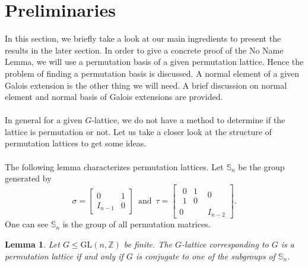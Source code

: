 \documentclass{article}
\theoremstyle{plain}
\newtheorem{lemma}[theorem]{Lemma}
\theoremstyle{definition}
\newcommand{\Z}{\ensuremath{\mathbb{Z}}}
\begin{document}
\section{Preliminaries}
In this section, we briefly take a look at our main ingredients to present the results in the later section. In order to give a concrete proof of the No Name Lemma, we will use a permutation basis of a given permutation lattice. Hence the problem of finding a permutation basis is discussed. A normal element of a given Galois extension is the other thing we will need. A brief discussion on normal element and normal basis of Galois extensions are provided.\\
\\
In general for a given $G$-lattice, we do not have a method to determine if the lattice is permutation or not. Let us take a closer look at the structure of permutation lattices to get some ideas.  \\
\\The following lemma characterizes permutation lattices. Let $\mathbb{S}_n$ be the group generated by $$
\sigma = \left[ \begin{array}{c|c}
0 & 1\\
\hline
I_{n-1} &0
\end{array} \right] \,\,\,
\text{and} \,\,\,
\tau = \left[ \begin{array}{c|c}
\begin{array}{cc}
0 & 1\\
1 & 0
\end{array} & 0\\
\hline
0 & I_{n-2}
\end{array}
\right].$$ One can see $\mathbb{S}_n$ is the group of all permutation matrices.
\begin{lemma}\label{PermLatChar}
Let $ G \leq \mathrm{GL}(n,\mathbb{Z})$ be finite. The $G$-lattice corresponding to $G$ is a permutation lattice if and only if $G$ is conjugate to one of the subgroups of $\mathbb{S}_n$.
\end{lemma} 
\end{document}
